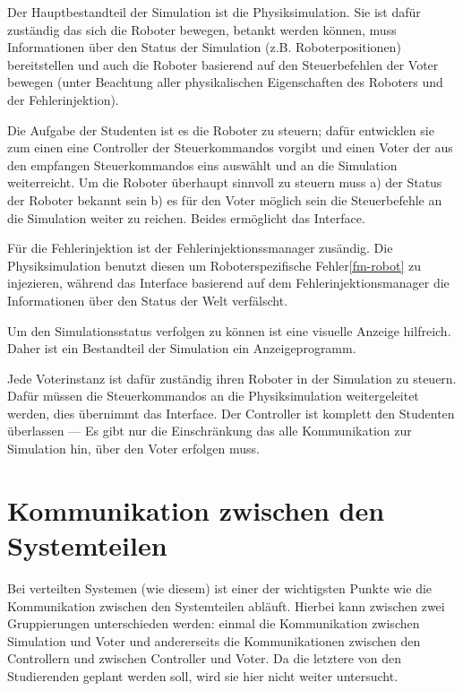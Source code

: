 Der Hauptbestandteil der Simulation ist die Physiksimulation. Sie ist daf{\"{u}}r zust{\"{a}}ndig
das sich die Roboter bewegen, betankt werden k{\"{o}}nnen, muss Informationen {\"{u}}ber den
Status der Simulation (z.B. Roboterpositionen) bereitstellen und auch die Roboter basierend
auf den Steuerbefehlen der Voter bewegen (unter Beachtung aller physikalischen Eigenschaften
des Roboters und der Fehlerinjektion).

Die Aufgabe der Studenten ist es die Roboter zu steuern; daf{\"{u}}r entwicklen sie zum einen eine Controller der Steuerkommandos
vorgibt und einen Voter der aus den empfangen Steuerkommandos eins ausw{\"{a}}hlt und an die Simulation weiterreicht.
Um die Roboter {\"{u}}berhaupt sinnvoll zu steuern muss a) der Status der Roboter bekannt sein b) es f{\"{u}}r den
Voter m{\"{o}}glich sein die Steuerbefehle an die Simulation weiter zu reichen. Beides
erm{\"{o}}glicht das Interface.

F{\"{u}}r die Fehlerinjektion ist der Fehlerinjektionssmanager zus{\"{a}}ndig. Die Physiksimulation
benutzt diesen um Roboterspezifische Fehler\ref{fm-robot} zu injezieren, w{\"{a}}hrend das
Interface basierend auf dem Fehlerinjektionsmanager die Informationen {\"{u}}ber den
Status der Welt verf{\"{a}}lscht.

Um den Simulationsstatus verfolgen zu k{\"{o}}nnen ist eine visuelle Anzeige hilfreich. Daher
ist ein Bestandteil der Simulation ein Anzeigeprogramm.

Jede Voterinstanz ist daf{\"{u}}r zust{\"{a}}ndig ihren Roboter in der Simulation zu steuern.
Daf{\"{u}}r m{\"{u}}ssen die Steuerkommandos an die Physiksimulation weitergeleitet werden,
dies {\"{u}}bernimmt das Interface. Der Controller ist komplett den Studenten {\"{u}}berlassen ---
Es gibt nur die Einschr{\"{a}}nkung das alle Kommunikation zur Simulation hin, {\"{u}}ber den Voter erfolgen muss.

\clearpage
\section{Kommunikation zwischen den Systemteilen}
Bei verteilten Systemen (wie diesem) ist einer der wichtigsten Punkte wie die Kommunikation zwischen den Systemteilen abl{\"{a}}uft.
Hierbei kann zwischen zwei Gruppierungen unterschieden werden: einmal die Kommunikation zwischen Simulation und Voter und andererseits
die Kommunikationen zwischen den Controllern und zwischen Controller und Voter. Da die letztere von den Studierenden geplant werden soll,
wird sie hier nicht weiter untersucht.

